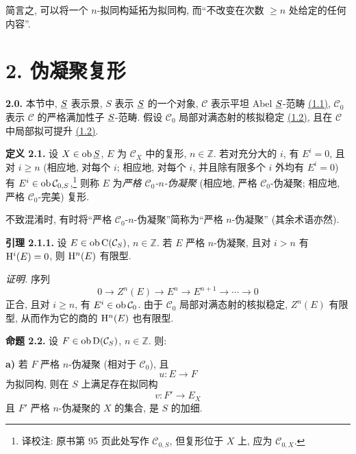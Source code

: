 简言之, 可以将一个 \(n\)-拟同构延拓为拟同构, 而“不改变在次数 \(\geq n\) 处给定的任何内容”.

\section*{2. 伪凝聚复形}

\textbf{2.0.} 本节中, \(\underline S\) 表示景, \(S\) 表示 \(\underline S\) 的一个对象, \(\mathcal C\) 表示平坦 Abel \(\underline S\)-范畴 \hyperlink{sga6.e01.sec.1.1}{(1.1)}, \(\mathcal C_0\) 表示 \(\mathcal C\) 的严格满加性子 \(\underline S\)-范畴. 假设 \(\mathcal C_0\) 局部对满态射的核拟稳定 \hyperlink{sga6.e01.sec.1.2}{(1.2)}, 且在 \(\mathcal C\) 中局部拟可提升 \hyperlink{sga6.e01.sec.1.2}{(1.2)}.

\textbf{定义 2.1.} 设 \(X\in\operatorname{ob}\underline S\), \(E\) 为 \(\mathcal C_X\) 中的复形, \(n\in\mathbb Z\). 若对充分大的 \(i\), 有 \(E^i=0\), 且对 \(i\geq n\) (相应地, 对每个 \(i\); 相应地, 对每个 \(i\), 并且除有限多个 \(i\) 外均有 \(E^i=0\)) 有 \(E^i\in\operatorname{ob}\mathcal C_{0,S}\),\footnote{译校注: 原书第 95 页此处写作 \(\mathcal C_{0,S}\), 但复形位于 \(X\) 上, 应为 \(\mathcal C_{0,X}\).} 则称 \(E\) 为\emph{严格 \(\mathcal C_0\)-\(n\)-伪凝聚} (相应地, 严格 \(\mathcal C_0\)-伪凝聚; 相应地, 严格 \(\mathcal C_0\)-完美) 复形.

不致混淆时, 有时将“严格 \(\mathcal C_0\)-\(n\)-伪凝聚”简称为“严格 \(n\)-伪凝聚” (其余术语亦然).

\textbf{引理 2.1.1.} 设 \(E\in\operatorname{ob}\mathrm C(\mathcal C_S)\), \(n\in\mathbb Z\). 若 \(E\) 严格 \(n\)-伪凝聚, 且对 \(i>n\) 有 \(\mathrm H^i(E)=0\), 则 \(\mathrm H^n(E)\) 有限型.

\emph{证明.} 序列
\[
  0\longrightarrow Z^n(E)\longrightarrow E^n\longrightarrow E^{n+1}\longrightarrow\cdots\longrightarrow 0
\]
正合, 且对 \(i\geq n\), 有 \(E^i\in\operatorname{ob}\mathcal C_0\). 由于 \(\mathcal C_0\) 局部对满态射的核拟稳定, \(Z^n(E)\) 有限型, 从而作为它的商的 \(\mathrm H^n(E)\) 也有限型.

\textbf{命题 2.2.} 设 \(F\in\operatorname{ob}\mathrm D(\mathcal C_S)\), \(n\in\mathbb Z\). 则:

\textbf{a)} 若 \(F\) 严格 \(n\)-伪凝聚 (相对于 \(\mathcal C_0\)), 且
\[
  u:E\longrightarrow F
\]
为拟同构, 则在 \(S\) 上满足存在拟同构
\[
  v:F'\longrightarrow E_X
\]
且 \(F'\) 严格 \(n\)-伪凝聚的 \(X\) 的集合, 是 \(S\) 的加细.

